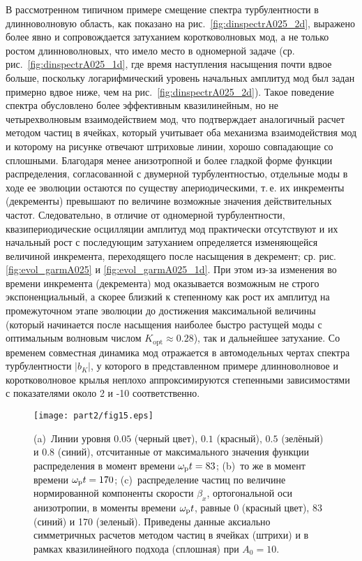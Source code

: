 В рассмотренном типичном примере смещение спектра турбулентности в длинноволновую область, как показано на рис.~\ref{fig:dinspectrA025_2d}, выражено более явно и сопровождается затуханием коротковолновых мод, а не только ростом длинноволновых, что имело место в одномерной задаче (ср. рис.~\ref{fig:dinspectrA025_1d}, где время наступления насыщения почти вдвое больше, поскольку логарифмический уровень начальных амплитуд мод был задан примерно вдвое ниже, чем на рис.~\ref{fig:dinspectrA025_2d}). Такое поведение спектра обусловлено более эффективным квазилинейным, но не четырехволновым взаимодействием мод, что подтверждает аналогичный расчет методом частиц в ячейках, который учитывает оба механизма взаимодействия мод и которому на рисунке отвечают штриховые линии, хорошо совпадающие со сплошными. Благодаря менее анизотропной и более гладкой форме функции распределения, согласованной с двумерной турбулентностью, отдельные моды в ходе ее эволюции остаются по существу апериодическими, т.\,е. их инкременты (декременты) превышают по величине возможные значения действительных частот. Следовательно, в отличие от одномерной турбулентности, квазипериодические осцилляции амплитуд мод практически отсутствуют и их начальный рост с последующим затуханием определяется изменяющейся величиной инкремента, переходящего после насыщения в декремент; ср. рис. \ref{fig:evol_garmA025} и \ref{fig:evol_garmA025_1d}. При этом из-за изменения во времени инкремента (декремента) мод оказывается возможным не строго экспоненциальный, а скорее близкий к степенному как рост их амплитуд на промежуточном этапе эволюции до достижения максимальной величины (который начинается после насыщения наиболее быстро растущей моды с оптимальным волновым числом $K_\mathrm{opt}\approx0.28$), так и дальнейшее затухание. Со временем совместная динамика мод отражается в автомодельных чертах спектра турбулентности $|b_K|$, у которого в представленном примере длинноволновое и коротковолновое крылья неплохо аппроксимируются степенными зависимостями с показателями около 2 и -10 соответственно.
\begin{figure}[t]   
\centering
\texttt{[image: part2/fig15.eps]}
\caption{(a)~Линии уровня $0.05$ (черный цвет), $0.1$ (красный), $0.5$ (зелёный) и $0.8$ (синий), отсчитанные от максимального значения функции распределения в момент времени $\omega_\mathrm{p} t =83$; (b)~то же в момент времени $\omega_\mathrm{p} t =170$; (c)~распределение частиц по величине нормированной компоненты скорости $\beta_x$, ортогональной оси анизотропии, в моменты времени $\omega_\mathrm{p} t$, равные 0 (красный цвет), 83 (синий) и 170 (зеленый). Приведены данные аксиально симметричных расчетов методом частиц в ячейках (штрихи) и в рамках квазилинейного подхода (сплошная) при $A_0=10$.
}
\label{fig:sravnenie_FR2dax_3im}
\end{figure}

